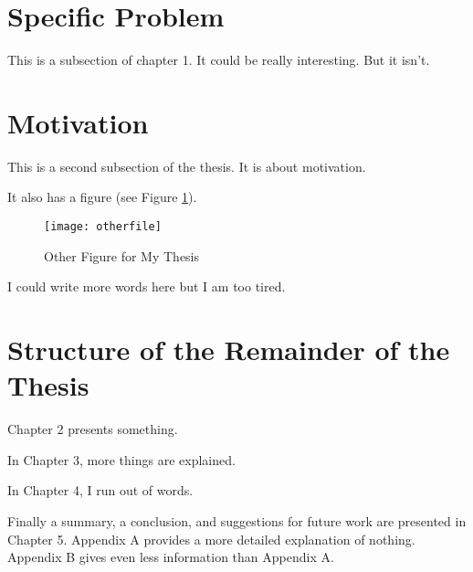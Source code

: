 \section{Specific Problem}
\label{SpecificProblem}

\indent 
This is a subsection of chapter 1.  It could be really interesting.
But it isn't.

\section{Motivation}
\label{Motivation}

\indent  This is a second subsection of the thesis.
It is about motivation.

It also has a figure (see Figure \ref{OtherPicture}).

\begin{figure}[tb]
\centering
\texttt{[image: otherfile]}
\caption{Other Figure for My Thesis}
\label{OtherPicture}
\end{figure}


I could write more words here but I am too tired.

\section{Structure of the Remainder of the Thesis}
\label{StructureOfTheRemainderOfTheThesis}
	
\indent 
Chapter 2 presents something.

In Chapter 3, more things are explained.

In Chapter 4, I run out of words.

Finally a summary, a conclusion, and suggestions for future work are presented in Chapter 5.  
Appendix A provides a more detailed explanation of nothing.  Appendix B gives even
less information than Appendix A.
